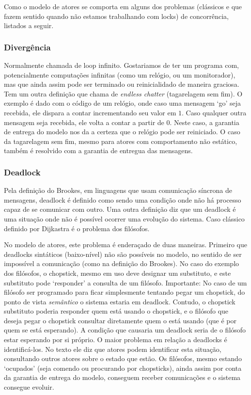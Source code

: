 \documentclass[]{article}
\begin{document}
		
		\par Como o modelo de atores se comporta em alguns dos problemas (clássicos e que fazem sentido quando não
		estamos trabalhando com locks) de concorrência, listados a seguir.
		
		\subsubsection{Divergência}
		\par Normalmente chamada de loop infinito. Gostariamos de ter um programa com, potencialmente computações
		infinitas (como um relógio, ou um monitorador), mas que ainda assim pode ser terminado ou reinicialidado de
		maneira graciosa. Tem um outra definição que chama de \textit{endless chatter} (tagarelagem sem fim). O
		exemplo é dado com o código de um relógio, onde caso uma mensagem `go' seja recebida, ele dispara a contar
		incrementando seu valor em $1$. Caso qualquer outra mensagem seja recebida, ele volta a contar a partir de $0$.
		Neste caso, a garantia de entrega do modelo nos da a certeza que o relógio pode ser reiniciado. O caso
		da tagarelagem sem fim, mesmo para atores com comportamento não estático, também é resolvido com a garantia
		de entregua das mensagens.
		
		\subsubsection{Deadlock}
		\par Pela definição do Brookes, em linguagens que usam comunicação síncrona de mensagens, deadlock é definido
		como sendo uma condição onde não há processo capaz de se comunicar com outro. Uma outra definição diz que
		um deadlock é uma situação onde não é possível ocorrer uma evolução do sistema. Caso clássico definido
		por Dijkastra é o problema dos filósofos.

		\par No modelo de atores, este problema é enderaçado de duas maneiras. Primeiro que deadlocks sintáticos 
		(baixo-nível) não são possíveis no modelo, no sentido de ser impossível a comunicação (como na definição do
		Brookes). No caso do exemplo dos filósofos, o chopstick, mesmo em uso deve designar um substituto, e este
		substituto pode `responder' a consulta de um filósofo. Importante: No caso de um filósofo ser programado
		para ficar simplesmente tentando pegar um chopstick, do ponto de vista \emph{semântico} o sistema estaria
		em deadlock. Contudo, o chopstick substituto poderia responder quem está usando o chopstick, e o filósofo
		que deseja pegar o chopstick consultar diretamente quem o está usando (que é por quem se está esperando).
		A condição que causaria um deadlock seria de o filósofo estar esperando por si próprio. O maior problema
		em relação a deadlocks é identificá-los. No texto ele diz que atores podem identificar esta situação, 
		consultando outros atores sobre o estado que estão. Os filósofos, mesmo estando `ocupados' (seja comendo ou 
		procurando por chopsticks), ainda assim por conta da garantia de entrega do modelo, conseguem receber 
		comunicações e o sistema consegue evoluir.
		
\end{document}
